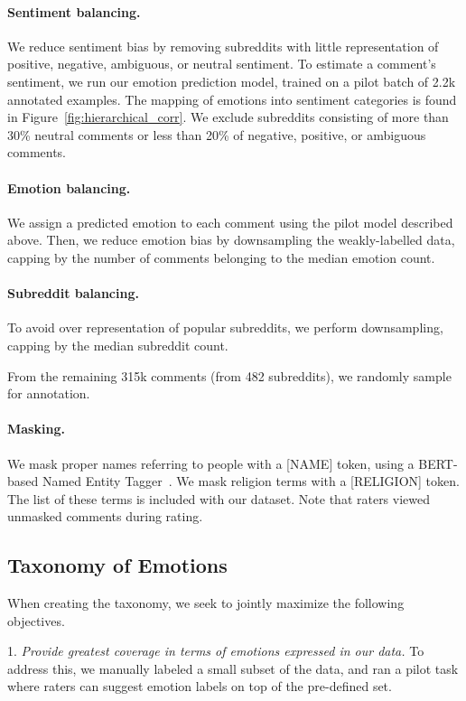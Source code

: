 \documentclass[11pt,a4paper]{article}
\begin{document}
\paragraph{Sentiment balancing.} We reduce sentiment bias by removing subreddits with little representation of positive, negative, ambiguous, or neutral sentiment. To estimate a comment's sentiment, we run our emotion prediction model, trained on a pilot batch of 2.2k annotated examples. The mapping of emotions into sentiment categories is found in Figure~\ref{fig:hierarchical_corr}. We exclude subreddits consisting of more than 30\% neutral comments or less than 20\% of negative, positive, or ambiguous comments.

\paragraph{Emotion balancing.}
We assign a predicted emotion to each comment using the pilot model described above. Then, we reduce emotion bias by downsampling the weakly-labelled data, capping by the number of comments belonging to the median emotion count.

\paragraph{Subreddit balancing.} To avoid over representation of popular subreddits, we perform downsampling, capping by the median subreddit count. 

From the remaining 315k comments (from 482 subreddits), we randomly sample for annotation.

\paragraph{Masking.} We mask proper names referring to people with a [NAME] token, using a BERT-based Named Entity Tagger~\citep{tsai2019small}. We mask religion terms with a [RELIGION] token. The list of these terms is included with our dataset. Note that raters viewed unmasked comments during rating.




\subsection{Taxonomy of Emotions}
\label{ssec:taxonomy}
When creating the taxonomy, we seek to jointly maximize the following objectives.

1. \emph{Provide greatest coverage in terms of emotions expressed in our data.} 
To address this, we manually labeled a small subset of the data, and ran a pilot task where raters can suggest emotion labels on top of the pre-defined set. 
\end{document}

